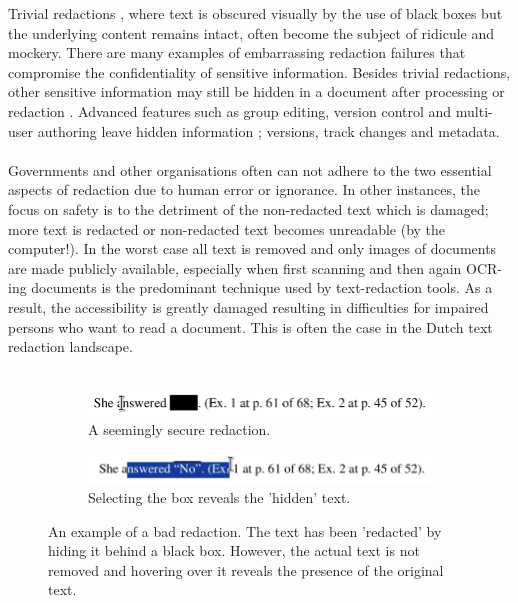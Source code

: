 Trivial redactions \cite{forrester2005investigation}, where text is obscured visually by the use of black boxes but the underlying content remains intact, often become the subject of ridicule and mockery. There are many examples of embarrassing redaction failures \cite{failures2019} that compromise the confidentiality of  sensitive information. Besides trivial redactions, other sensitive information may still be hidden in a document after processing or redaction \cite{muller2021processing}. Advanced features such as group editing, version control and multi-user authoring leave hidden information \cite{forrester2005investigation}; versions, track changes and metadata. 
\\\\
Governments and other organisations often can not adhere to the two essential aspects of redaction due to human error or ignorance. In other instances, the focus on safety is to the detriment of the non-redacted text which is damaged; more text is redacted or non-redacted text becomes unreadable (by the computer!). In the worst case all text is removed and only images of documents are made publicly available, especially when first scanning and then again OCR-ing documents is the predominant technique used by text-redaction tools. As a result, the accessibility is greatly damaged \cite{maartenMarx} resulting in difficulties for impaired persons who want to read a document. This is often the case in the Dutch text redaction landscape. 
\\\\
\begin{figure}[h]
    \begin{subfigure}[h]{0.5\linewidth}
        \includegraphics[width=\linewidth]{latex/media/badredaction2.png}
        \caption{A seemingly secure redaction.}
    \end{subfigure}
    \hfill
        \begin{subfigure}[h]{0.5\linewidth}
        \includegraphics[width=\linewidth]{latex/media/badredaction.png}
    \caption{Selecting the box reveals the 'hidden' text.}
    \end{subfigure}%
\caption{An example of a bad redaction. The text has been 'redacted' by hiding it behind a black box. However, the actual text is not removed and hovering over it reveals the presence of the original text.}
\end{figure}\\
